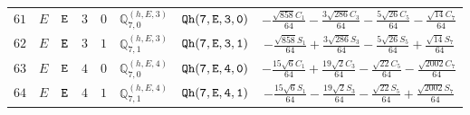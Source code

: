 \documentclass[fleqn,8pt]{jsarticle}
\begin{document}
\begin{table}[ht!]
\begin{center}
\begin{tabular}{cccccccc}
$ 61 $ & $ E $ & $ {\tt E} $ & $ 3 $ & $ 0 $ & $ \mathbb{Q}_{7,0}^{(h,E,3)} $ & $ {\tt Qh(7,E,3,0)} $ & $ - \frac{\sqrt{858} C_{1}}{64} - \frac{3 \sqrt{286} C_{3}}{64} - \frac{5 \sqrt{26} C_{5}}{64} - \frac{\sqrt{14} C_{7}}{64} $ \\
$ 62 $ & $ E $ & $ {\tt E} $ & $ 3 $ & $ 1 $ & $ \mathbb{Q}_{7,1}^{(h,E,3)} $ & $ {\tt Qh(7,E,3,1)} $ & $ - \frac{\sqrt{858} S_{1}}{64} + \frac{3 \sqrt{286} S_{3}}{64} - \frac{5 \sqrt{26} S_{5}}{64} + \frac{\sqrt{14} S_{7}}{64} $ \\
$ 63 $ & $ E $ & $ {\tt E} $ & $ 4 $ & $ 0 $ & $ \mathbb{Q}_{7,0}^{(h,E,4)} $ & $ {\tt Qh(7,E,4,0)} $ & $ - \frac{15 \sqrt{6} C_{1}}{64} + \frac{19 \sqrt{2} C_{3}}{64} - \frac{\sqrt{22} C_{5}}{64} - \frac{\sqrt{2002} C_{7}}{64} $ \\
$ 64 $ & $ E $ & $ {\tt E} $ & $ 4 $ & $ 1 $ & $ \mathbb{Q}_{7,1}^{(h,E,4)} $ & $ {\tt Qh(7,E,4,1)} $ & $ - \frac{15 \sqrt{6} S_{1}}{64} - \frac{19 \sqrt{2} S_{3}}{64} - \frac{\sqrt{22} S_{5}}{64} + \frac{\sqrt{2002} S_{7}}{64} $ \\
 \hline \hline
\end{tabular}
\end{center}
\end{table}
\end{document}
